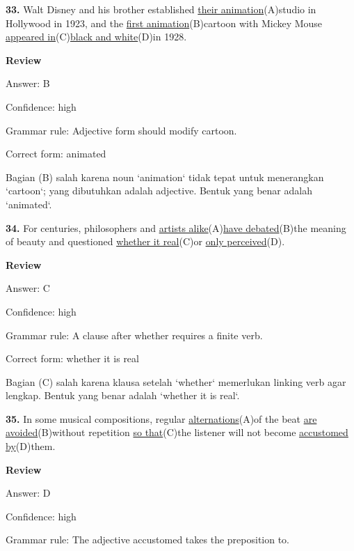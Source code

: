 \documentclass[12pt]{article}
\begin{document}
\endgroup
\par
\vspace{\questionblockgap}
\noindent\textbf{33.} Walt Disney and his brother established \uline{their animation}(A)studio in Hollywood in 1923, and the \uline{first animation}(B)cartoon with Mickey Mouse \uline{appeared in}(C)\uline{black and white}(D)in 1928.
\par
\begingroup
\setlength{\parskip}{0pt}
\setlength{\parindent}{0pt}
\textbf{Review}\par
Answer: B\par
Confidence: high\par
Grammar rule: Adjective form should modify cartoon.\par
Correct form: animated\par
Bagian (B) salah karena noun `animation` tidak tepat untuk menerangkan `cartoon`; yang dibutuhkan adalah adjective. Bentuk yang benar adalah `animated`.\par
\endgroup
\par
\vspace{\questionblockgap}
\noindent\textbf{34.} For centuries, philosophers and \uline{artists alike}(A)\uline{have debated}(B)the meaning of beauty and questioned \uline{whether it real}(C)or \uline{only perceived}(D).
\par
\begingroup
\setlength{\parskip}{0pt}
\setlength{\parindent}{0pt}
\textbf{Review}\par
Answer: C\par
Confidence: high\par
Grammar rule: A clause after whether requires a finite verb.\par
Correct form: whether it is real\par
Bagian (C) salah karena klausa setelah `whether` memerlukan linking verb agar lengkap. Bentuk yang benar adalah `whether it is real`.\par
\endgroup
\par
\vspace{\questionblockgap}
\noindent\textbf{35.} In some musical compositions, regular \uline{alternations}(A)of the beat \uline{are avoided}(B)without repetition \uline{so that}(C)the listener will not become \uline{accustomed by}(D)them.
\par
\begingroup
\setlength{\parskip}{0pt}
\setlength{\parindent}{0pt}
\textbf{Review}\par
Answer: D\par
Confidence: high\par
Grammar rule: The adjective accustomed takes the preposition to.\par
\end{document}
